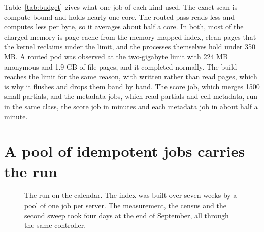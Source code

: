 \documentclass[sigconf, nonacm]{acmart}
\begin{document}
Table~\ref{tab:budget} gives what one job of each kind used. The exact scan is compute-bound and
holds nearly one core. The routed pass reads less and computes less per byte, so it averages about
half a core. In both, most of the charged memory is page cache from the memory-mapped index, clean
pages that the kernel reclaims under the limit, and the processes themselves hold under 350 MB. A
routed pod was observed at the two-gigabyte limit with 224 MB anonymous and 1.9 GB of file pages,
and it completed normally. The build reaches the limit for the same reason, with written rather
than read pages, which is why it flushes and drops them band by band. The score job, which
merges 1500 small partials, and the metadata jobs, which read partials and cell metadata, run in
the same class, the score job in minutes and each metadata job in about half a minute.

\section{A pool of idempotent jobs carries the run}
\label{sec:pool}

\begin{figure}[t]
\centering
{}
\caption{The run on the calendar. The index was built over seven weeks by a pool of one job
per server. The measurement, the census and the second sweep took four days at the end of
September, all through the same controller.}
\label{fig:timeline}
\end{figure}
\end{document}
